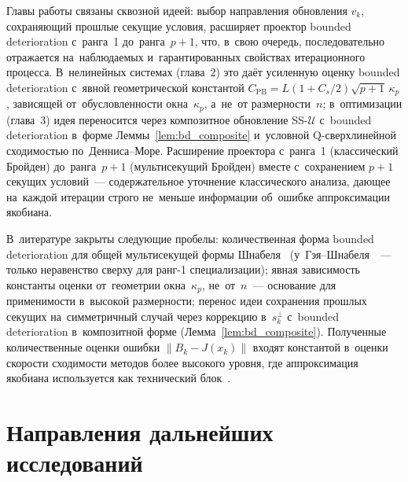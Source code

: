 Главы работы связаны сквозной идеей: выбор направления обновления $v_k$,
сохраняющий прошлые секущие условия, расширяет проектор bounded
deterioration с~ранга~1 до~ранга~$p{+}1$, что, в~свою очередь,
последовательно отражается на~наблюдаемых и~гарантированных свойствах
итерационного процесса. В~нелинейных системах (глава~2) это даёт
усиленную оценку bounded deterioration с~явной геометрической константой
$C_{\mathrm{PB}} = L(1{+}C_s/2)\sqrt{p+1}\,\kappa_p$, зависящей
от~обусловленности окна~$\kappa_p$, а~не~от размерности~$n$;
в~оптимизации (глава~3) идея переносится через композитное обновление
SS-$\mathcal{U}$ с~bounded deterioration в~форме Леммы~\ref{lem:bd_composite}
и~условной Q-сверхлинейной сходимостью по~Денниса--Море. Расширение
проектора с~ранга~1 (классический Бройден) до~ранга~$p{+}1$
(мультисекущий Бройден) вместе с~сохранением $p{+}1$ секущих условий~---
содержательное уточнение классического анализа, дающее на~каждой
итерации строго не~меньше информации об~ошибке аппроксимации якобиана.

В~литературе закрыты следующие пробелы: количественная форма bounded
deterioration для общей мультисекущей формы Шнабеля~\cite{schnabel1983}
(у~Гэя--Шнабеля~\cite{gay_schnabel1978}~--- только неравенство сверху
для ранг-1 специализации); явная зависимость константы оценки от~геометрии
окна~$\kappa_p$, не~от~$n$~--- основание для применимости в~высокой
размерности; перенос идеи сохранения прошлых секущих на~симметричный
случай через коррекцию в~$s_k^\perp$ с~bounded deterioration в~композитной
форме (Лемма~\ref{lem:bd_composite}). Полученные количественные оценки
ошибки $\|B_k - J(x_k)\|$ входят константой в~оценки скорости
сходимости методов более высокого уровня, где аппроксимация якобиана
используется как технический блок~\cite{viqa2024}.

\section*{Направления дальнейших исследований}

